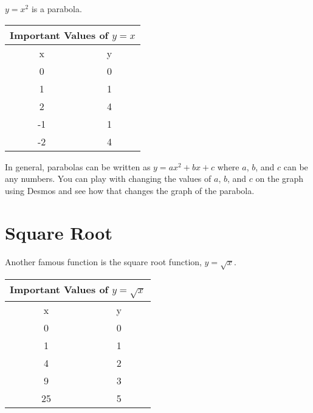 \documentclass{ximera}
\begin{document}
\begin{example}
$y=x^2$ is a parabola.


\begin{tabular}{ |c || c|  }
 \hline
 \multicolumn{2}{|c|}{Important Values of $y=x$} \\
\hline
 \hline
 x & y\\
 \hline
 0&0\\
 1&1\\
 2&4\\
 -1&1\\
 -2&4\\
 \hline
\end{tabular}

\end{example}

In general, parabolas can be written as $y=ax^2+bx+c$ where $a$, $b$, and $c$ can be any numbers.  You can play with changing the values of $a$, $b$, and $c$ on the graph using Desmos and see how that changes the graph of the parabola.  

\begin{center}  
\end{center}




\section{Square Root}
Another famous function is the square root function, $y=\sqrt{x}$.



\begin{tabular}{ |c || c|  }
 \hline
 \multicolumn{2}{|c|}{Important Values of $y=\sqrt{x}$} \\
\hline
 \hline
 x & y\\
 \hline
 0&0\\
 1&1\\
 4&2\\
 9&3\\
 25&5\\
 \hline
\end{tabular}
\end{document}
